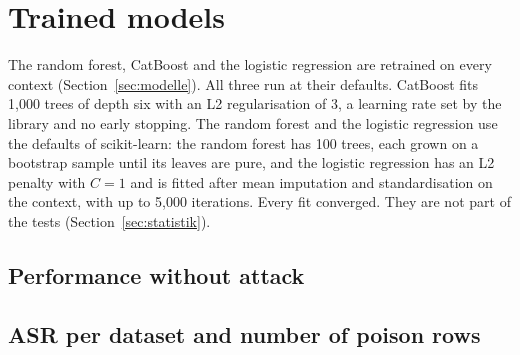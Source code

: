 \section{Trained models}\label{app:referenz}
\noindent The random forest, CatBoost and the logistic regression are retrained on every context (Section~\ref{sec:modelle}). All three run at their defaults. CatBoost fits 1,000 trees of depth six with an L2 regularisation of 3, a learning rate set by the library and no early stopping. The random forest and the logistic regression use the defaults of scikit-learn: the random forest has 100 trees, each grown on a bootstrap sample until its leaves are pure, and the logistic regression has an L2 penalty with $C = 1$ and is fitted after mean imputation and standardisation on the context, with up to 5,000 iterations. Every fit converged. They are not part of the tests (Section~\ref{sec:statistik}).
\subsection{Performance without attack}\label{app:trainiert_guete}
\begin{table}[H]\centering\scriptsize\caption{The trained models without attack, per dataset: the AUC on the test rows, mean over the five folds, and the number of correctly predicted, that is attacked, target rows. Last rows: mean $\pm$ SD of the AUC and sums.}\label{tab:app_trainiert_guete}\maxbreite{}\end{table}
\begin{landscape}
\subsection{ASR per dataset and number of poison rows}\label{app:trainiert_asr}
\end{landscape}

